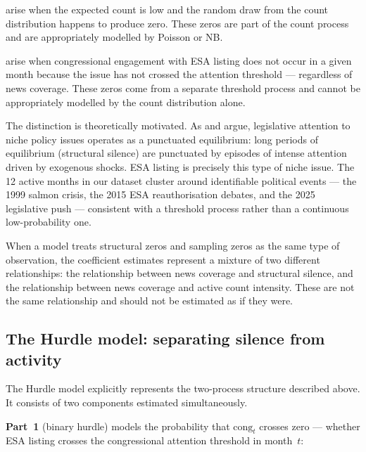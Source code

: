 \documentclass[11pt]{article}
\begin{document}
\begin{description}[leftmargin=2em, itemsep=4pt]
  \item[Sampling zeros] arise when the expected count is low and the
    random draw from the count distribution happens to produce zero.
    These zeros are part of the count process and are appropriately
    modelled by Poisson or NB.
  \item[Structural zeros] arise when congressional engagement with ESA
    listing does not occur in a given month because the issue has not
    crossed the attention threshold --- regardless of news coverage.
    These zeros come from a separate threshold process and cannot be
    appropriately modelled by the count distribution alone.
\end{description}
 
The distinction is theoretically motivated. As \citet{Baumgartner1993}
and \citet{Jones2004} argue, legislative attention to niche policy
issues operates as a punctuated equilibrium: long periods of equilibrium
(structural silence) are punctuated by episodes of intense attention
driven by exogenous shocks. ESA listing is precisely this type of
niche issue. The 12 active months in our dataset cluster around
identifiable political events --- the 1999 salmon crisis, the 2015 ESA
reauthorisation debates, and the 2025 legislative push --- consistent
with a threshold process rather than a continuous low-probability one.
 
When a model treats structural zeros and sampling zeros as the same type
of observation, the coefficient estimates represent a mixture of two
different relationships: the relationship between news coverage and
structural silence, and the relationship between news coverage and
active count intensity. These are not the same relationship and should
not be estimated as if they were.
 
\subsection{The Hurdle model: separating silence from activity}
 
The Hurdle model \citep{Mullahy1986, Zeileis2008} explicitly
represents the two-process structure described above. It consists of
two components estimated simultaneously.
 
\textbf{Part~1} (binary hurdle) models the probability that
$\text{cong}_{t}$ crosses zero --- whether ESA listing crosses the
congressional attention threshold in month~$t$:
 
\end{document}
